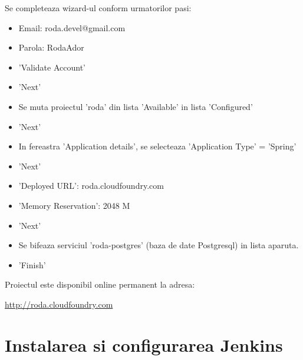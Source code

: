 Se completeaza wizard-ul conform urmatorilor pasi:
\begin{itemize}
  \item 
Email: roda.devel@gmail.com
  \item 
Parola: RodaAdor
  \item 
'Validate Account'
  \item 
'Next'
  \item 
Se muta proiectul 'roda' din lista 'Available' in lista 'Configured'
  \item 
'Next'
  \item 
In fereastra 'Application details', se selecteaza 'Application Type' = 'Spring'
  \item 
'Next'
  \item 
'Deployed URL': roda.cloudfoundry.com
  \item 
'Memory Reservation': 2048 M
  \item 
'Next'
  \item 
Se bifeaza serviciul 'roda-postgres' (baza de date Postgresql) in lista
aparuta.
  \item 
'Finish'
\end{itemize}

Proiectul este disponibil online permanent la adresa:

\url{http://roda.cloudfoundry.com}

\section{Instalarea si configurarea Jenkins}

